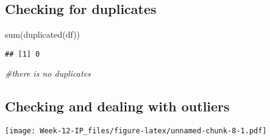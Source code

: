 \documentclass[
]{article}
\newenvironment{Shaded}{\begin{snugshade}}{\end{snugshade}}
\newcommand{\AttributeTok}[1]{\textcolor[rgb]{0.77,0.63,0.00}{#1}}
\newcommand{\CommentTok}[1]{\textcolor[rgb]{0.56,0.35,0.01}{\textit{#1}}}
\newcommand{\FunctionTok}[1]{\textcolor[rgb]{0.00,0.00,0.00}{#1}}
\newcommand{\NormalTok}[1]{#1}
\newcommand{\SpecialCharTok}[1]{\textcolor[rgb]{0.00,0.00,0.00}{#1}}
\newcommand{\StringTok}[1]{\textcolor[rgb]{0.31,0.60,0.02}{#1}}
\begin{document}
\hypertarget{checking-for-duplicates}{%
\subsection{Checking for duplicates}\label{checking-for-duplicates}}

\begin{Shaded}
\begin{Highlighting}[]
\FunctionTok{sum}\NormalTok{(}\FunctionTok{duplicated}\NormalTok{(df))}
\end{Highlighting}
\end{Shaded}

\begin{verbatim}
## [1] 0
\end{verbatim}

\begin{Shaded}
\begin{Highlighting}[]
\CommentTok{\#there is no duplicates}
\end{Highlighting}
\end{Shaded}

\hypertarget{checking-and-dealing-with-outliers}{%
\subsection{Checking and dealing with
outliers}\label{checking-and-dealing-with-outliers}}

\begin{Shaded}
\end{Shaded}

\texttt{[image: Week-12-IP\_files/figure-latex/unnamed-chunk-8-1.pdf]}

\begin{Shaded}
\end{Shaded}
\end{document}
